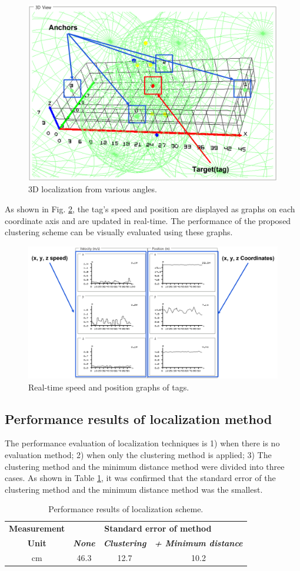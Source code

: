 \documentclass[conference]{IEEEtran}
\begin{document}
\begin{figure}[htbp]
\centerline{\includegraphics[width=0.62\columnwidth]{fig8.png}}
\caption{3D localization from various angles.}
\label{fig8}
\end{figure}

As shown in Fig. \ref{fig9}, the tag's speed and position are displayed as graphs on each coordinate axis and are updated in real-time. The performance of the proposed clustering scheme can be visually evaluated using these graphs.

\begin{figure}[htbp]
\centerline{\includegraphics[width=0.62\columnwidth]{fig9.png}}
\caption{Real-time speed and position graphs of tags.}
\label{fig9}
\end{figure}

\subsection{Performance results of localization method}
The performance evaluation of localization techniques is 1) when there is no evaluation method; 2) when only the clustering method is applied; 3) The clustering method and the minimum distance method were divided into three cases. As shown in Table \ref{tab1}, it was confirmed that the standard error of the clustering method and the minimum distance method was the smallest.

\begin{table}[htbp]
\caption{Performance results of localization scheme.}
\begin{center}
\begin{tabular}{|c|c|c|c|}
\hline
\textbf{Measurement}&\multicolumn{3}{|c|}{\textbf{Standard error of method}} \\
\cline{2-4} 
\textbf{Unit} & \textbf{\textit{None}}& \textbf{\textit{Clustering}}& \textbf{\textit{+ Minimum distance}} \\
\hline
cm & 46.3 & 12.7 & 10.2 \\
\hline
\end{tabular}
\label{tab1}
\end{center}
\end{table}
\end{document}
